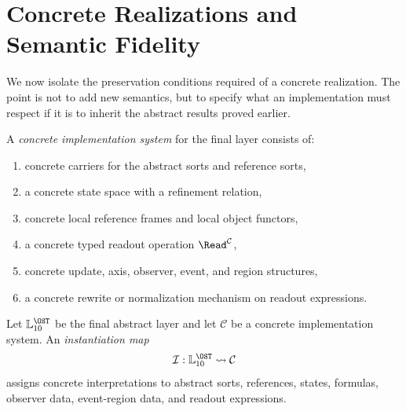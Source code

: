 \section{Concrete Realizations and Semantic Fidelity}\label{sec:conservativity}

We now isolate the preservation conditions required of a concrete realization. The point is not to add new semantics, but to specify what an implementation must respect if it is to inherit the abstract results proved earlier.

\begin{definition}\label{def:concrete-implementation-system}
A \emph{concrete implementation system} for the final layer consists of:
\begin{enumerate}[label=(\roman*),nosep]
\item concrete carriers for the abstract sorts and reference sorts,
\item a concrete state space with a refinement relation,
\item concrete local reference frames and local object functors,
\item a concrete typed readout operation $\Read^{\mathcal C}$,
\item concrete update, axis, observer, event, and region structures,
\item a concrete rewrite or normalization mechanism on readout expressions.
\end{enumerate}
\end{definition}

\begin{definition}\label{def:instantiation-map}
Let $\mathbb{L}_{10}^{\OST}$ be the final abstract layer and let $\mathcal C$ be a concrete implementation system. An \emph{instantiation map}
\[
\mathcal I:\mathbb{L}_{10}^{\OST}\leadsto \mathcal C
\]
assigns concrete interpretations to abstract sorts, references, states, formulas, observer data, event-region data, and readout expressions.
\end{definition}

